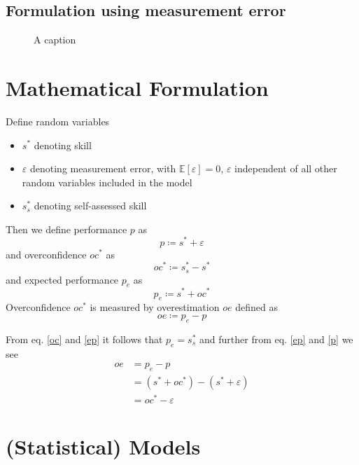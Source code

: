 \documentclass[a4paper,11pt]{article}
\renewcommand*{\epsilon}{\varepsilon}%
\newcommand{\1}{\mathbf{1}}
\newcommand{\Exp}{\mathbb{E}}
\begin{document}
\subsection{Formulation using measurement error}

\begin{figure}[H]
  \vspace{1cm}
  \begin{center}
  
  \end{center}
  \caption{A caption}
  \label{fig:typetree}
\end{figure}

\section{Mathematical Formulation}
Define random variables
\begin{itemize}
 \item $s^*$ denoting skill
 \item $\epsilon$ denoting measurement error, with $\Exp[\epsilon] = 0$, $\epsilon$ independent of all other random variables included in the model
 \item $s^*_s$ denoting self-assessed skill
\end{itemize}

\noindent Then we define performance $p$ as
\begin{equation} \label{p}
  p \coloneq s^* + \epsilon
\end{equation}
and overconfidence $oc^*$ as
\begin{equation} \label{oc}
  oc^* \coloneq s^*_s-s^*
\end{equation}
and expected performance $p_e$ as
\begin{equation} \label{ep}
  p_e \coloneq s^* + oc^*
\end{equation}
Overconfidence $oc^*$ is measured by overestimation $oe$ defined as
\begin{equation}
  oe \coloneq p_e - p
\end{equation}

\noindent From eq. \ref{oc} and \ref{ep} it follows that $p_e = s^*_s$ and further from eq. \ref{ep} and \ref{p} we see
\begin{align}
  oe &= p_e - p \\
  &= (s^* + oc^*) - (s^* + \epsilon) \\
  &= oc^* - \epsilon
\end{align}
\section{(Statistical) Models}
\end{document}
